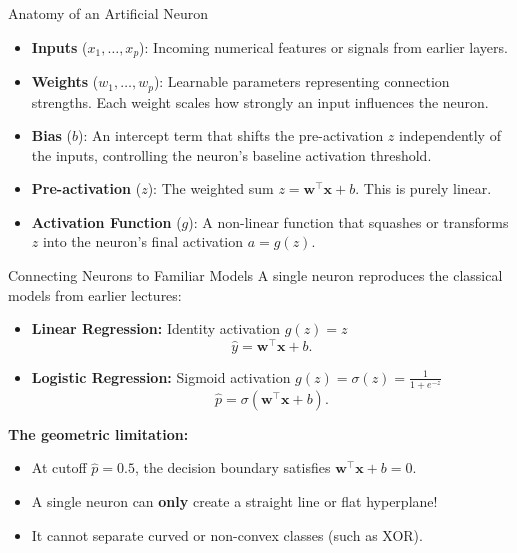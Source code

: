 \begin{frame}{Anatomy of an Artificial Neuron}
    \begin{itemize}
        \item \textbf{Inputs} ($x_1, \dots, x_p$): Incoming numerical features or signals from earlier layers.
        \item \textbf{Weights} ($w_1, \dots, w_p$): Learnable parameters representing connection strengths. Each weight scales how strongly an input influences the neuron.
        \item \textbf{Bias} ($b$): An intercept term that shifts the pre-activation $z$ independently of the inputs, controlling the neuron's baseline activation threshold.
        \item \textbf{Pre-activation} ($z$): The weighted sum $z = \mathbf{w}^\top \mathbf{x} + b$. This is purely linear.
        \item \textbf{Activation Function} ($g$): A non-linear function that squashes or transforms $z$ into the neuron's final activation $a = g(z)$.
    \end{itemize}
\end{frame}

\begin{frame}{Connecting Neurons to Familiar Models}
    A single neuron reproduces the classical models from earlier lectures:
    \begin{itemize}
        \item \textbf{Linear Regression:} Identity activation $g(z) = z$
        \[
            \hat{y} = \mathbf{w}^\top \mathbf{x} + b.
        \]
        \item \textbf{Logistic Regression:} Sigmoid activation $g(z) = \sigma(z) = \frac{1}{1+e^{-z}}$
        \[
            \hat{p} = \sigma(\mathbf{w}^\top \mathbf{x} + b).
        \]
    \end{itemize}
    \pause
    \svspace{0.3em}
    \textbf{The geometric limitation:}
    \begin{itemize}
        \item At cutoff $\hat{p} = 0.5$, the decision boundary satisfies $\mathbf{w}^\top \mathbf{x} + b = 0$.
        \item A single neuron can \textbf{only} create a straight line or flat hyperplane!
        \item It cannot separate curved or non-convex classes (such as XOR).
    \end{itemize}
\end{frame}


